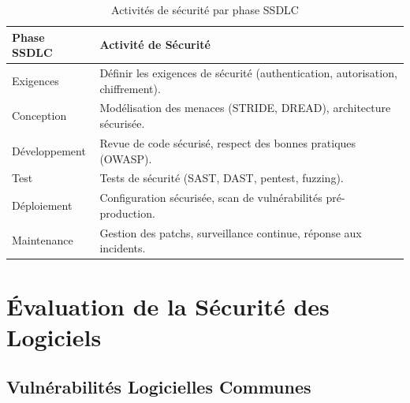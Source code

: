 \begin{table}[H]
\centering
\small
\begin{tabular}{p{3.5cm}p{8cm}}
    \toprule
    \textbf{Phase SSDLC} & \textbf{Activité de Sécurité} \\
    \midrule
    Exigences         & Définir les exigences de sécurité (authentication, autorisation, chiffrement). \\
    Conception        & Modélisation des menaces (STRIDE, DREAD), architecture sécurisée. \\
    Développement     & Revue de code sécurisé, respect des bonnes pratiques (OWASP). \\
    Test              & Tests de sécurité (SAST, DAST, pentest, fuzzing). \\
    Déploiement       & Configuration sécurisée, scan de vulnérabilités pré-production. \\
    Maintenance       & Gestion des patchs, surveillance continue, réponse aux incidents. \\
    \bottomrule
\end{tabular}
\caption{Activités de sécurité par phase SSDLC}
\end{table}

\section{Évaluation de la Sécurité des Logiciels}

\subsection{Vulnérabilités Logicielles Communes}

